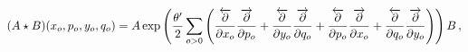 \begin{equation}
(A\star B)(x_{o},p_{o},y_{o},q_{o})=A\exp \left( {\frac{\theta ^{\prime }}{2}%
}\sum_{o>0}\left( {\frac{\overleftarrow{\partial }}{\partial x_{o}}}{\frac{%
\overrightarrow{\partial }}{\partial p_{o}}}+{\frac{\overleftarrow{\partial }%
}{\partial y_{o}}}{\frac{\overrightarrow{\partial }}{\partial q_{o}}}+{\frac{%
\overleftarrow{\partial }}{\partial p_{o}}}{\frac{\overrightarrow{\partial }%
}{\partial x_{o}}}+{\frac{\overleftarrow{\partial }}{\partial q_{o}}}{\frac{%
\overrightarrow{\partial }}{\partial y_{o}}}\right) \right) B\,,
\label{e_M1}
\end{equation}

